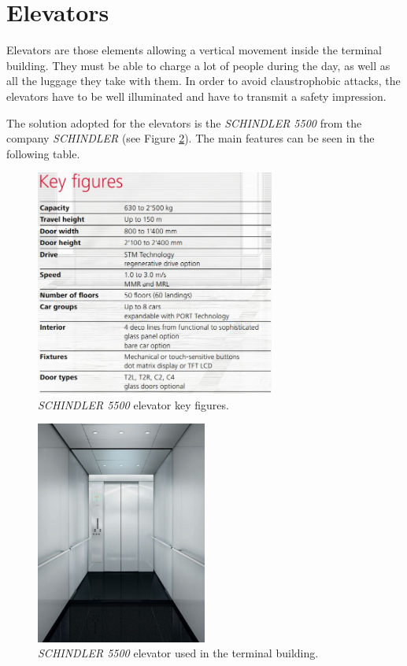 	\section{Elevators}
Elevators are those elements allowing a vertical movement inside the terminal building. They must be able to charge a lot of people during the day, as well as all the luggage they take with them. In order to avoid claustrophobic attacks, the elevators have to be well illuminated and have to transmit a safety impression.

The solution adopted for the elevators is the \textit{SCHINDLER 5500} from the company \textit{SCHINDLER} (see Figure \ref{elevator}). The main features can be seen in the following table.

\begin{figure}[H]
	\centering
	\includegraphics[clip, trim=0cm 0cm 0cm 0cm, width=0.7\textwidth]{./images/indoorclosures/elevatorfigures}
	\caption{\textit{SCHINDLER 5500} elevator key figures.}
	\label{elevatorfigures}
\end{figure}

\begin{figure}[H]
	\centering
	\includegraphics[clip, trim=0cm 0cm 0cm 0cm, width=0.5\textwidth]{./images/indoorclosures/elevator}
	\caption{\textit{SCHINDLER 5500} elevator used in the terminal building.}
	\label{elevator}
\end{figure}


